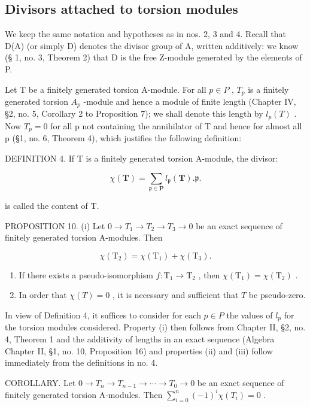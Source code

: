 \subsection{Divisors attached to torsion modules}

We keep the same notation and hypotheses as in nos. 2, 3 and 4. Recall that D(A) (or simply D) denotes the divisor group of A, written additively: we know (§ 1, no. 3, Theorem 2) that D is the free Z-module generated by the elements of P.

Let T be a finitely generated torsion A-module. For all \(p \in P\) , \(T_{p}\) is a finitely generated torsion \(A_{p}\) -module and hence a module of finite length (Chapter IV, §2, no. 5, Corollary 2 to Proposition 7); we shall denote this length by \(l_{p}(T)\) . Now \(T_{p} = 0\) for all p not containing the annihilator of T and hence for almost all p (§1, no. 6, Theorem 4), which justifies the following definition:

DEFINITION 4. If T is a finitely generated torsion A-module, the divisor:

\[
\chi (\mathbf {T}) = \sum_ {\mathfrak {p} \in \mathbf {P}} l _ {\mathfrak {p}} (\mathbf {T}). \mathfrak {p}.
\]

is called the content of T.

PROPOSITION 10. (i) Let \(0 \to T_1 \to T_2 \to T_3 \to 0\) be an exact sequence of finitely generated torsion A-modules. Then

\[
\chi (\mathrm{T} _ {2}) = \chi (\mathrm{T} _ {1}) + \chi (\mathrm{T} _ {3}).
\]

\begin{enumerate}
\def\labelenumi{(\roman{enumi})}
\setcounter{enumi}{1}
\item
  If there exists a pseudo-isomorphism \(f \colon \mathrm{T}_1 \to \mathrm{T}_2\) , then \(\chi(\mathrm{T}_1) = \chi(\mathrm{T}_2)\) .
\item
  In order that \(\chi(T) = 0\) , it is necessary and sufficient that \(T\) be pseudo-zero.
\end{enumerate}

In view of Definition 4, it suffices to consider for each \(p \in P\) the values of \(l_{p}\) for the torsion modules considered. Property (i) then follows from Chapter II, §2, no. 4, Theorem 1 and the additivity of lengths in an exact sequence (Algebra Chapter II, §1, no. 10, Proposition 16) and properties (ii) and (iii) follow immediately from the definitions in no. 4.

COROLLARY. Let \(0 \to T_n \to T_{n-1} \to \cdots \to T_0 \to 0\) be an exact sequence of finitely generated torsion A-modules. Then \(\sum_{i=0}^{n} (-1)^i \chi(T_i) = 0\) .

